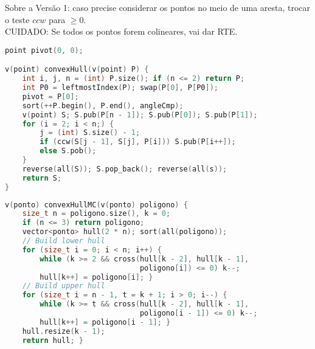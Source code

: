 Sobre a Versão 1: caso precise considerar os pontos no meio de uma aresta, trocar o teste $ccw$ para $\geq 0$.\\
CUIDADO: Se todos os pontos forem colineares, vai dar RTE.
\begin{lstlisting}[language=C++, title=Fecho Convexo - Versão 1]
point pivot(0, 0);

v(point) convexHull(v(point) P) {
	int i, j, n = (int) P.size(); if (n <= 2) return P;
	int P0 = leftmostIndex(P); swap(P[0], P[P0]);
	pivot = P[0];
	sort(++P.begin(), P.end(), angleCmp);
	v(point) S; S.pub(P[n - 1]); S.pub(P[0]); S.pub(P[1]);
	for (i = 2; i < n;) {
		j = (int) S.size() - 1;
		if (ccw(S[j - 1], S[j], P[i])) S.pub(P[i++]);
		else S.pob();
	}
	reverse(all(S)); S.pop_back(); reverse(all(s));
	return S;
}
\end{lstlisting}

\begin{lstlisting}[language=C++, title=Fecho Convexo - Versão 2 - Andrew's Monotone Chain]
v(ponto) convexHullMC(v(ponto) poligono) {
    size_t n = poligono.size(), k = 0;
	if (n <= 3) return poligono;
	vector<ponto> hull(2 * n); sort(all(poligono));
	// Build lower hull
	for (size_t i = 0; i < n; i++) {
		while (k >= 2 && cross(hull[k - 2], hull[k - 1],
		                       poligono[i]) <= 0) k--;
		hull[k++] = poligono[i]; }
	// Build upper hull
	for (size_t i = n - 1, t = k + 1; i > 0; i--) {
		while (k >= t && cross(hull[k - 2], hull[k - 1],
		                       poligono[i - 1]) <= 0) k--;
		hull[k++] = poligono[i - 1]; }
	hull.resize(k - 1);
	return hull; }
\end{lstlisting}